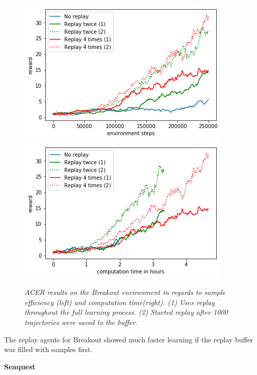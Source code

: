 \begin{figure}[h]
\includegraphics[scale=0.55]{bilder/breakoutreplayonline.png}
\includegraphics[scale=0.55]{bilder/breakoutreplaytime.png}
\caption{\textit{ACER results on the Breakout environment in regards to sample efficiency (left) and computation time(right). (1) Uses replay throughout the full learning process. (2) Started replay after 1000 trajectories were saved to the buffer.}}
\end{figure}

The replay agents for Breakout showed much faster learning if the replay buffer was filled with samples first.

\begin{center}
\textbf{Seaquest}
\end{center}

